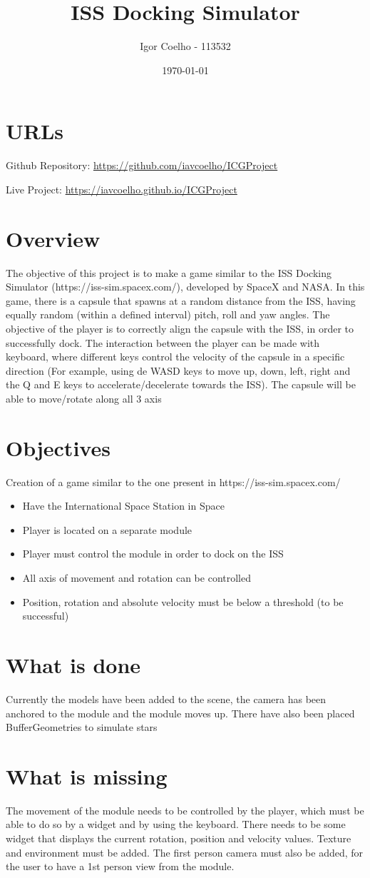 \documentclass{report}
\title{ISS Docking Simulator}
\author{Igor Coelho - 113532}
\date{\today}
\begin{document}
\maketitle
\section{URLs}
Github Repository: \url{https://github.com/iavcoelho/ICGProject}

Live Project: \url{https://iavcoelho.github.io/ICGProject}
\section{Overview}
The objective of this project is to make a game similar to the ISS
Docking Simulator (https://iss-sim.spacex.com/), developed by SpaceX
and NASA.
In this game, there is a capsule that spawns at a random distance from
the ISS, having equally random (within a defined interval) pitch, roll and
yaw angles. The objective of the player is to correctly align the capsule
with the ISS, in order to successfully dock.
The interaction between the player can be made with keyboard, where
different keys control the velocity of the capsule in a specific direction
(For example, using de WASD keys to move up, down, left, right and the
Q and E keys to accelerate/decelerate towards the ISS).
The capsule will be able to move/rotate along all 3 axis
\section{Objectives}
Creation of a game similar to the one present in https://iss-sim.spacex.com/
\begin{itemize}
\item Have the International Space Station in Space
\item Player is located on a separate module
\item Player must control the module in order to dock on the ISS
\item All axis of movement and rotation can be controlled
\item Position,  rotation and absolute velocity must be below a threshold (to be successful)
\end{itemize}
\section{What is done}

Currently the models have been added to the scene, the camera has been anchored to the module and the module moves up.
There have also been placed BufferGeometries to simulate stars

\section{What is missing}

The movement of the module needs to be controlled by the player, which must be able to do so by a widget and by using the keyboard.
There needs to be some widget that displays the current rotation, position and velocity values.
Texture and environment must be added.
The first person camera must also be added, for the user to have a 1st person view from the module.
\end{document}
